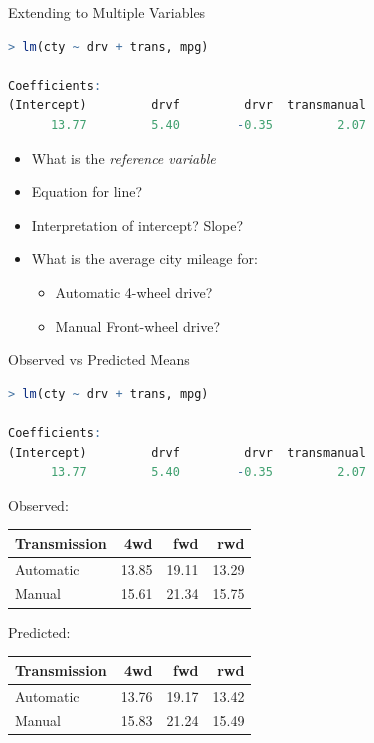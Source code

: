 \documentclass{beamer}
\begin{document}
\begin{frame}[fragile]{Extending to Multiple Variables}

\begin{lstlisting}[language=R]
> lm(cty ~ drv + trans, mpg)

Coefficients:
(Intercept)         drvf         drvr  transmanual  
      13.77         5.40        -0.35         2.07 
\end{lstlisting}


\begin{itemize}
\item What is the \textit{reference variable}
\item Equation for line?
\item Interpretation of intercept? Slope?
\item What is the average city mileage for:
\begin{itemize}\footnotesize
	\item Automatic 4-wheel drive?
	\item Manual Front-wheel drive?
\end{itemize}
\end{itemize}

\end{frame}

\begin{frame}[fragile]{Observed vs Predicted Means}
\begin{lstlisting}[language=R]
> lm(cty ~ drv + trans, mpg)

Coefficients:
(Intercept)         drvf         drvr  transmanual  
      13.77         5.40        -0.35         2.07 
\end{lstlisting}

Observed: \\
\begin{table}[ht]
\centering
\begin{tabular}{lrrr}
  \hline
Transmission & 4wd & fwd & rwd \\ 
  \hline
Automatic &  13.85 & 19.11 & 13.29 \\
Manual & 15.61 & 21.34 & 15.75 \\  \hline
\end{tabular}
\end{table}

Predicted: \\

\begin{table}[ht]
\centering
\begin{tabular}{lrrr}
  \hline
Transmission & 4wd & fwd & rwd \\ 
  \hline
Automatic &  13.76 & 19.17 & 13.42 \\
Manual & 15.83 & 21.24 & 15.49 \\  \hline
\end{tabular}
\end{table}

\end{frame}
\end{document}
